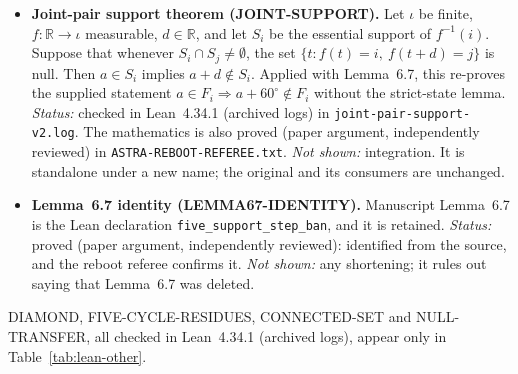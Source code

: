 \documentclass[11pt]{article}
\theoremstyle{definition}
\theoremstyle{remark}
\begin{document}
\begin{itemize}
\item \textbf{Joint-pair support theorem (JOINT-SUPPORT).}
Let $\iota$ be finite, $f:\mathbb{R}\to\iota$ measurable, $d\in\mathbb{R}$, and
let $S_i$ be the essential support of $f^{-1}(i)$. Suppose that whenever
$S_i\cap S_j\neq\emptyset$, the set $\{t: f(t)=i,\ f(t+d)=j\}$ is null. Then
$a\in S_i$ implies $a+d\notin S_i$. Applied with Lemma~6.7, this re-proves the
supplied statement $a\in F_i\Rightarrow a+60^\circ\notin F_i$ without the
strict-state lemma.
\emph{Status:} checked in Lean~4.34.1 (archived logs) in
\texttt{joint-\allowbreak{}pair-\allowbreak{}support-\allowbreak{}v2.\allowbreak{}log}. The mathematics is also proved (paper
argument, independently reviewed) in \texttt{ASTRA-\allowbreak{}REBOOT-\allowbreak{}REFEREE.\allowbreak{}txt}.
\emph{Not shown:} integration. It is standalone under a new name; the original
and its consumers are unchanged.

\item \textbf{Lemma~6.7 identity (LEMMA67-IDENTITY).}
Manuscript Lemma~6.7 is the Lean declaration \texttt{five\_\allowbreak{}support\_\allowbreak{}step\_\allowbreak{}ban},
and it is retained. \emph{Status:} proved (paper argument, independently
reviewed): identified from the source, and the reboot referee confirms it.
\emph{Not shown:} any shortening; it rules out saying that Lemma~6.7 was
deleted.
\end{itemize}

DIAMOND, FIVE-CYCLE-RESIDUES, CONNECTED-SET and NULL-TRANSFER, all checked in
Lean~4.34.1 (archived logs), appear only in Table~\ref{tab:lean-other}.

\end{document}

